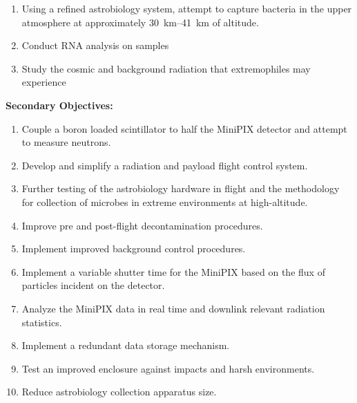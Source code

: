 


	\begin{enumerate}
	\item Using a refined astrobiology system, attempt to capture bacteria in the upper atmosphere at approximately \SIrange{30}{41}{\kilo\meter} of altitude.
%	
%
	\item Conduct RNA analysis on samples
	\item Study the cosmic and background radiation that extremophiles may experience
	\end{enumerate}
%
{\bf Secondary Objectives:}
\begin{enumerate}
\item Couple a boron loaded scintillator to half the MiniPIX detector and attempt to measure neutrons.
\item Develop and simplify a radiation and payload flight control system.
\item Further testing of the astrobiology hardware in flight and the methodology for collection of microbes in extreme environments at high-altitude. 
\item Improve pre and post-flight decontamination procedures.
\item Implement improved background control procedures. 
\item Implement a variable shutter time for the MiniPIX based on the flux of particles incident on the detector.
\item Analyze the MiniPIX data in real time and downlink relevant radiation statistics.
\item Implement a redundant data storage mechanism.
\item Test an improved enclosure against impacts and harsh environments.
\item Reduce astrobiology collection apparatus size.

\end{enumerate}

